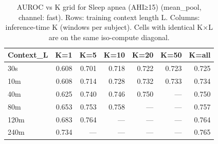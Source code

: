 \begin{table}[ht]
\centering
\caption{AUROC vs K grid for Sleep apnea (AHI≥15) (mean_pool, channel: fast). Rows: training context length L. Columns: inference-time K (windows per subject). Cells with identical K×L are on the same iso-compute diagonal.}
\label{tab:kgrid_apnea_binary_mean_pool_fast}
\begin{tabular}{lrrrrrr}
\toprule
Context_L & K=1 & K=5 & K=10 & K=20 & K=50 & K=all \\
\midrule
30s & 0.608 & 0.701 & 0.718 & 0.722 & 0.723 & 0.725 \\
10m & 0.608 & 0.714 & 0.728 & 0.732 & 0.733 & 0.734 \\
40m & 0.625 & 0.740 & 0.746 & 0.750 & — & 0.750 \\
80m & 0.653 & 0.753 & 0.758 & — & — & 0.757 \\
120m & 0.683 & 0.764 & — & — & — & 0.764 \\
240m & 0.734 & — & — & — & — & 0.765 \\
\bottomrule
\end{tabular}
\end{table}